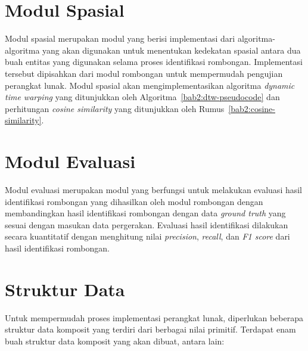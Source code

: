 \section{Modul Spasial}
\label{sec:des-spatial}

Modul spasial merupakan modul yang berisi implementasi dari algoritma-algoritma yang akan digunakan untuk menentukan kedekatan spasial antara dua buah entitas yang digunakan selama proses identifikasi rombongan. Implementasi tersebut dipisahkan dari modul rombongan untuk mempermudah pengujian perangkat lunak. Modul spasial akan mengimplementasikan algoritma \textit{dynamic time warping} yang ditunjukkan oleh Algoritma~\ref{bab2:dtw-pseudocode} dan perhitungan \textit{cosine similarity} yang ditunjukkan oleh Rumus~\ref{bab2:cosine-similarity}.

\section{Modul Evaluasi}
\label{sec:des-evaluation}

Modul evaluasi merupakan modul yang berfungsi untuk melakukan evaluasi hasil identifikasi rombongan yang dihasilkan oleh modul rombongan dengan membandingkan hasil identifikasi rombongan dengan data \textit{ground truth} yang sesuai dengan masukan data pergerakan. Evaluasi hasil identifikasi dilakukan secara kuantitatif dengan menghitung nilai \textit{precision}, \textit{recall}, dan \textit{F1 score} dari hasil identifikasi rombongan.

\section{Struktur Data}
\label{sec:des-struct}

Untuk mempermudah proses implementasi perangkat lunak, diperlukan beberapa struktur data komposit yang terdiri dari berbagai nilai primitif. Terdapat enam buah struktur data komposit yang akan dibuat, antara lain:

\clearpage

